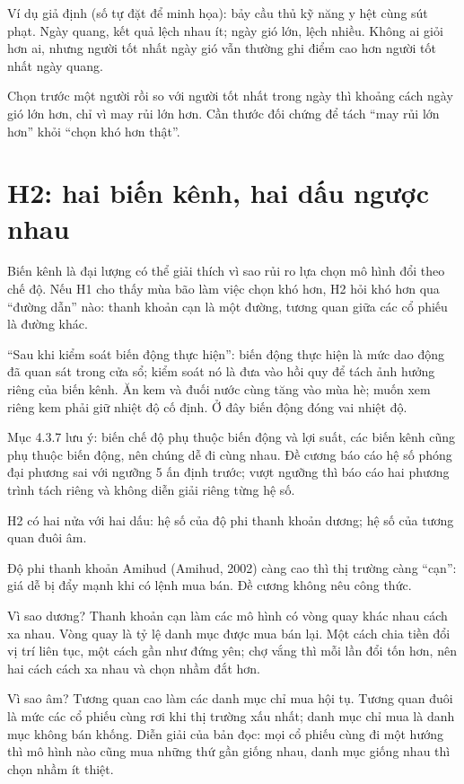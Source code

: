 \begin{tcolorbox}[breakable]
Ví dụ giả định (số tự đặt để minh họa): bảy cầu thủ kỹ năng y hệt cùng sút phạt. Ngày quang, kết quả lệch nhau ít; ngày gió lớn, lệch nhiều. Không ai giỏi hơn ai, nhưng người tốt nhất ngày gió vẫn thường ghi điểm cao hơn người tốt nhất ngày quang.

Chọn trước một người rồi so với người tốt nhất trong ngày thì khoảng cách ngày gió lớn hơn, chỉ vì may rủi lớn hơn. Cần thước đối chứng để tách “may rủi lớn hơn” khỏi “chọn khó hơn thật”.
\end{tcolorbox}

\section{H2: hai biến kênh, hai dấu ngược nhau}

Biến kênh là đại lượng có thể giải thích vì sao rủi ro lựa chọn mô hình đổi theo chế độ. Nếu H1 cho thấy mùa bão làm việc chọn khó hơn, H2 hỏi khó hơn qua “đường dẫn” nào: thanh khoản cạn là một đường, tương quan giữa các cổ phiếu là đường khác.

“Sau khi kiểm soát biến động thực hiện”: biến động thực hiện là mức dao động đã quan sát trong cửa sổ; kiểm soát nó là đưa vào hồi quy để tách ảnh hưởng riêng của biến kênh. Ăn kem và đuối nước cùng tăng vào mùa hè; muốn xem riêng kem phải giữ nhiệt độ cố định. Ở đây biến động đóng vai nhiệt độ.

Mục 4.3.7 lưu ý: biến chế độ phụ thuộc biến động và lợi suất, các biến kênh cũng phụ thuộc biến động, nên chúng dễ đi cùng nhau. Đề cương báo cáo hệ số phóng đại phương sai với ngưỡng 5 ấn định trước; vượt ngưỡng thì báo cáo hai phương trình tách riêng và không diễn giải riêng từng hệ số.

H2 có hai nửa với hai dấu: hệ số của độ phi thanh khoản dương; hệ số của tương quan đuôi âm.

Độ phi thanh khoản Amihud (Amihud, 2002) càng cao thì thị trường càng “cạn”: giá dễ bị đẩy mạnh khi có lệnh mua bán. Đề cương không nêu công thức.

Vì sao dương? Thanh khoản cạn làm các mô hình có vòng quay khác nhau cách xa nhau. Vòng quay là tỷ lệ danh mục được mua bán lại. Một cách chia tiền đổi vị trí liên tục, một cách gần như đứng yên; chợ vắng thì mỗi lần đổi tốn hơn, nên hai cách cách xa nhau và chọn nhầm đắt hơn.

Vì sao âm? Tương quan cao làm các danh mục chỉ mua hội tụ. Tương quan đuôi là mức các cổ phiếu cùng rơi khi thị trường xấu nhất; danh mục chỉ mua là danh mục không bán khống. Diễn giải của bản đọc: mọi cổ phiếu cùng đi một hướng thì mô hình nào cũng mua những thứ gần giống nhau, danh mục giống nhau thì chọn nhầm ít thiệt.

